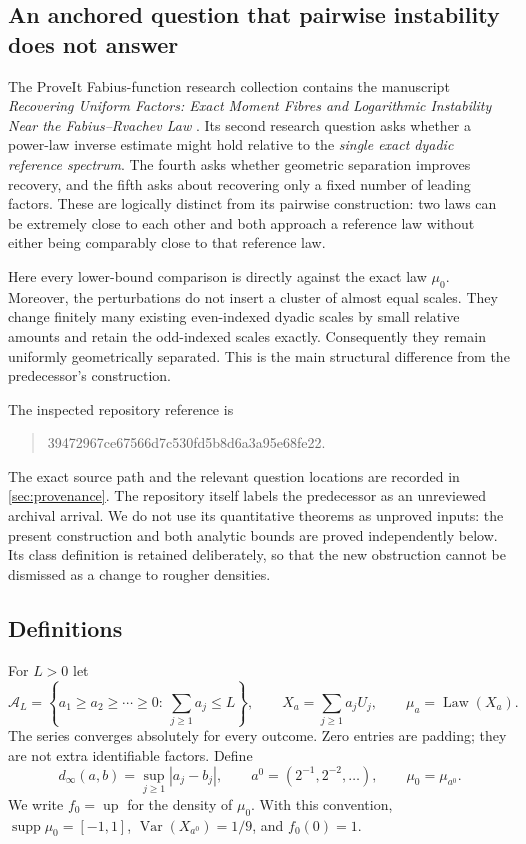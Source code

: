 \documentclass[11pt,a4paper]{article}
\numberwithin{equation}{section}
\theoremstyle{definition}
\theoremstyle{remark}
\DeclareMathOperator{\Law}{Law}
\DeclareMathOperator{\Var}{Var}
\DeclareMathOperator{\supp}{supp}
\newcommand{\A}{\mathcal A}
\newcommand{\up}{\operatorname{up}}
\newcommand{\repoSHA}{39472967ce67566d7c530fd5b8d6a3a95e68fe22}
\begin{document}
\subsection{An anchored question that pairwise instability does not answer}

The ProveIt Fabius-function research collection contains the manuscript
\emph{Recovering Uniform Factors: Exact Moment Fibres and Logarithmic
Instability Near the Fabius--Rvachev Law} \cite{predecessor}.
Its second research question asks whether a power-law inverse estimate might
hold relative to the \emph{single exact dyadic reference spectrum}.
The fourth asks whether geometric separation improves recovery, and the fifth
asks about recovering only a fixed number of leading factors.
These are logically distinct from its pairwise construction: two laws can be
extremely close to each other and both approach a reference law without either
being comparably close to that reference law.

Here every lower-bound comparison is directly against the exact law $\mu_0$.
Moreover, the perturbations do not insert a cluster of almost equal scales.
They change finitely many existing even-indexed dyadic scales by small relative
amounts and retain the odd-indexed scales exactly. Consequently they remain
uniformly geometrically separated. This is the main structural difference
from the predecessor's construction.

The inspected repository reference is
\begin{quote}\small\ttfamily\raggedright
\repoSHA.
\end{quote}
The exact source path and the relevant question locations are recorded in
\cref{sec:provenance}. The repository itself labels the predecessor as an
unreviewed archival arrival. We do not use its quantitative theorems as
unproved inputs: the present construction and both analytic bounds are proved
independently below. Its class definition is retained deliberately, so that the
new obstruction cannot be dismissed as a change to rougher densities.

\subsection{Definitions}

For $L>0$ let
\begin{equation}
 \A_L=\left\{a_1\ge a_2\ge\cdots\ge0:\ \sum_{j\ge1}a_j\le L\right\},
 \qquad
 X_a=\sum_{j\ge1}a_jU_j,\qquad \mu_a=\Law(X_a).
 \label{eq:class}
\end{equation}
The series converges absolutely for every outcome. Zero entries are padding;
they are not extra identifiable factors. Define
\begin{equation}
 d_\infty(a,b)=\sup_{j\ge1}|a_j-b_j|,
 \qquad a^0=(2^{-1},2^{-2},\ldots),\qquad \mu_0=\mu_{a^0}.
\end{equation}
We write $f_0=\up$ for the density of $\mu_0$. With this convention,
$\supp\mu_0=[-1,1]$, $\Var(X_{a^0})=1/9$, and $f_0(0)=1$.
\end{document}
